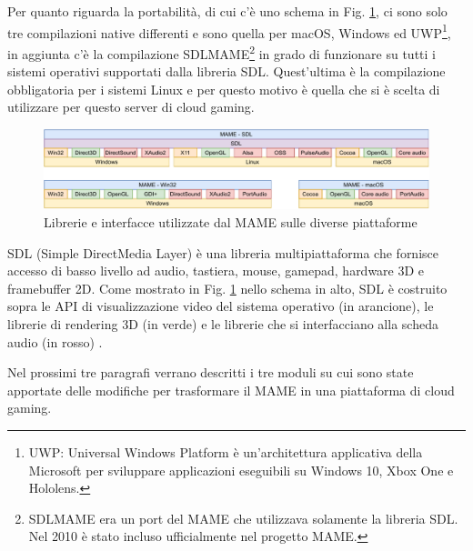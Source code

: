 Per quanto riguarda la portabilità, di cui c'è uno schema in Fig. \ref{fig:mame_architettura_full}, ci sono solo tre compilazioni native differenti e sono quella per macOS, Windows ed UWP\footnote{UWP: Universal Windows Platform è un'architettura applicativa della Microsoft per sviluppare applicazioni eseguibili su Windows 10, Xbox One e Hololens.}, in aggiunta c'è la compilazione SDLMAME\footnote{SDLMAME era un port del MAME che utilizzava solamente la libreria SDL. Nel 2010 è stato incluso ufficialmente nel progetto MAME.} in grado di funzionare su tutti i sistemi operativi supportati dalla libreria SDL. Quest'ultima è la compilazione obbligatoria per i sistemi Linux e per questo motivo è quella che si è scelta di utilizzare per questo server di cloud gaming.

\begin{figure}[H]
	\includegraphics[width=\linewidth]{immagini/mame_architettura_full}
	\caption{Librerie e interfacce utilizzate dal MAME sulle diverse piattaforme}
	\label{fig:mame_architettura_full}
\end{figure}

SDL (Simple DirectMedia Layer) è una libreria multipiattaforma che fornisce accesso di basso livello ad audio, tastiera, mouse, gamepad, hardware 3D e framebuffer 2D. Come mostrato in Fig. \ref{fig:mame_architettura_full} nello schema in alto, SDL è costruito sopra le API di visualizzazione video del sistema operativo (in arancione), le librerie di rendering 3D (in verde) e le librerie che si interfacciano alla scheda audio (in rosso) \parencite{SDL_Wiki}.

Nel prossimi tre paragrafi verrano descritti i tre moduli su cui sono state apportate delle modifiche per trasformare il MAME in una piattaforma di cloud gaming.


